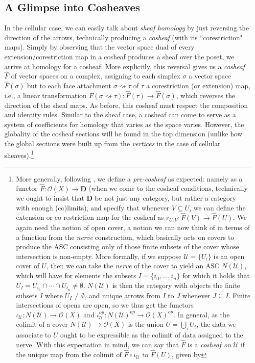 \documentclass[11pt]{book}
\theoremstyle{definition}
\theoremstyle{definition}
\theoremstyle{definition}
\theoremstyle{theorem}
\theoremstyle{definition}
\begin{document}
\subsection{A Glimpse into Cosheaves}
In the cellular case, we can easily talk about \textit{sheaf homology} by just reversing the direction of the arrows, technically producing a \textit{cosheaf} (with its ``corestriction" maps). Simply by observing that the vector space dual of every extension/corestriction map in a cosheaf produces a sheaf over the poset, we arrive at homology for a cosheaf. More explicitly, this reversal gives us a \textit{cosheaf} $\hat{F}$ of vector spaces on a complex, assigning to each simplex $\sigma$ a vector space $\hat{F}(\sigma)$ but to each face attachment $\sigma \rightsquigarrow \tau$ of $\tau$ a corestriction (or extension) map, i.e., a linear transformation $\hat{F}(\sigma \rightsquigarrow \tau): \hat{F}(\tau) \rightarrow \hat{F}(\sigma)$, which reverses the direction of the sheaf maps. As before, this cosheaf must respect the composition and identity rules. Similar to the sheaf case, a cosheaf can come to serve as a system of coefficients for homology that varies as the space varies. However, the globality of the cosheaf sections will be found in the top dimension (unlike how the global sections were built up from the \textit{vertices} in the case of cellular sheaves).\footnote{More generally, following \cite{curry_sheaves_2013}, we define a \textit{pre-cosheaf} as expected: namely as a functor $\hat{F}: \mathscr{O}(X) \rightarrow \textbf{D}$ (when we come to the cosheaf conditions, technically we ought to insist that $\textbf{D}$ be not just any category, but rather a category with enough (co)limits), and specify that whenever $V \subseteq U$, we can define the extension or co-restriction map for the cosheaf as $r_{U,V}: \hat{F}(V) \rightarrow \hat{F}(U)$. We again need the notion of open cover, a notion we can now think of in terms of a function from the \textit{nerve} construction, which basically acts on covers to produce the ASC consisting only of those finite subsets of the cover whose intersection is non-empty. More formally, if we suppose $\mathscr{U} = \{U_i\}$ is an open cover of $U$, then we can take the \textit{nerve} of the cover to yield an ASC $N(\mathscr{U})$, which will have for elements the subsets $I = \{i_0, \dots, i_n \}$ for which it holds that $U_I = U_{i_0} \cap \cdots \cap U_{i_n} \neq \emptyset$. $N(\mathscr{U})$ is then the category with objects the finite subsets $I$ where $U_I \neq \emptyset$, and unique arrows from $I$ to $J$ whenever $J \subseteq  I$. Finite intersections of opens are open, so we thus get the functors $\iota_{\mathscr{U}}: N(\mathscr{U}) \rightarrow \mathscr{O}(X)$ and $\iota_{\mathscr{U}}^{op}: N(\mathscr{U})^{op} \rightarrow \mathscr{O}(X)^{op}$. In general, as the colimit of a cover $N(\mathscr{U}) \rightarrow \mathscr{O}(X)$ is the union $U = \bigcup_i U_i$, the data we associate to $U$ ought to be expressible as the colimit of data assigned to the nerve. With this expectation in mind, we can say that $\hat{F}$ is a \textit{cosheaf on} $\mathscr{U}$ if the unique map from the colimit of $\hat{F} \circ \iota_{\mathscr{U}}$ to $\hat{F}(U)$, given by 
}
\end{document}
